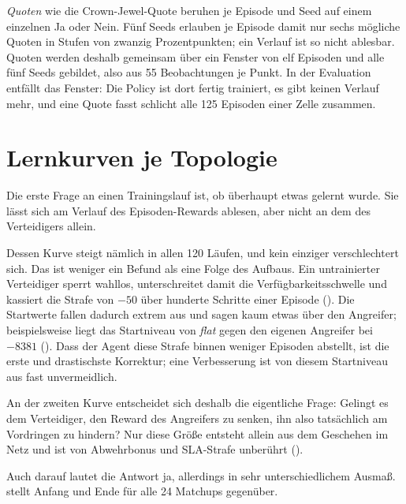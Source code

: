 \emph{Quoten} wie die Crown-Jewel-Quote beruhen je Episode und Seed auf
einem einzelnen Ja oder Nein. Fünf Seeds erlauben je Episode damit nur sechs
mögliche Quoten in Stufen von zwanzig Prozentpunkten; ein Verlauf ist so
nicht ablesbar. Quoten werden deshalb gemeinsam über ein Fenster
von elf Episoden und alle fünf Seeds gebildet, also aus 55 Beobachtungen je
Punkt. In der Evaluation entfällt das Fenster: Die Policy ist dort fertig trainiert, es gibt keinen Verlauf mehr, und eine Quote fasst schlicht alle
125 Episoden einer Zelle zusammen.

\section{Lernkurven je Topologie}
\label{sec:lernkurven}

Die erste Frage an einen Trainingslauf ist, ob überhaupt etwas gelernt wurde.
Sie lässt sich am Verlauf des Episoden-Rewards ablesen, aber nicht an dem des
Verteidigers allein.

Dessen Kurve steigt nämlich in allen 120 Läufen, und kein einziger
verschlechtert sich. Das ist weniger ein Befund als eine Folge des Aufbaus.
Ein untrainierter Verteidiger sperrt wahllos, unterschreitet damit die
Verfügbarkeitsschwelle und kassiert die Strafe von $-50$ über hunderte
Schritte einer Episode (). Die Startwerte fallen dadurch extrem
aus und sagen kaum etwas über den Angreifer; beispielsweise liegt das
Startniveau von \emph{flat} gegen den eigenen Angreifer bei $-8381$ (). Dass der Agent diese Strafe binnen weniger Episoden abstellt,
ist die erste und drastischste Korrektur; eine Verbesserung ist von
diesem Startniveau aus fast unvermeidlich.

An der zweiten Kurve entscheidet sich deshalb die eigentliche Frage: Gelingt es dem
Verteidiger, den Reward des Angreifers zu senken, ihn also tatsächlich am
Vordringen zu hindern? Nur diese Größe entsteht allein aus dem Geschehen im
Netz und ist von Abwehrbonus und \ac{SLA}-Strafe unberührt
().

Auch darauf lautet die Antwort ja, allerdings in sehr unterschiedlichem
Ausmaß.  stellt Anfang und Ende für alle 24
Matchups gegenüber.

